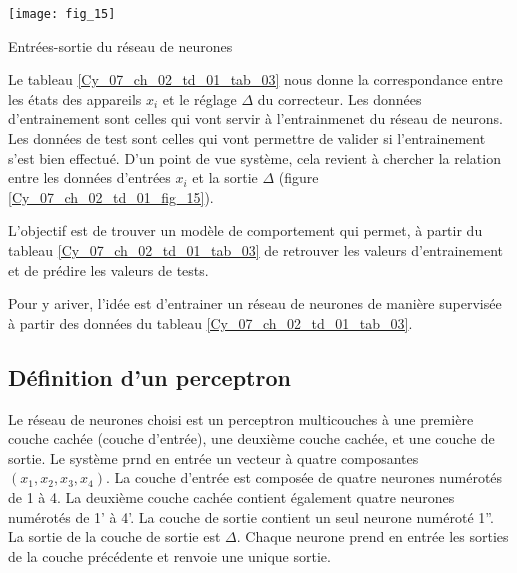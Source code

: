 \begin{marginfigure}
\centering
\texttt{[image: fig\_15]}
\caption{Entrées-sortie du réseau de neurones\label{Cy_07_ch_02_td_01_fig_15}}
\end{marginfigure}

Le tableau \ref{Cy_07_ch_02_td_01_tab_03} nous donne la correspondance entre les états des appareils $x_i$ et le réglage $\Delta$ du correcteur. Les données d'entrainement sont celles qui vont servir à l'entrainmenet du réseau de neurons. Les données de test sont celles qui vont permettre de valider si l'entrainement s'est bien effectué. D'un point de vue système, cela revient à chercher la relation entre les données d'entrées $x_i$ et la sortie $\Delta$ (figure \ref{Cy_07_ch_02_td_01_fig_15}). 


L'objectif est de trouver un modèle de comportement qui permet, à partir du tableau \ref{Cy_07_ch_02_td_01_tab_03} de retrouver les valeurs d'entrainement et de prédire les valeurs de tests. 

Pour y ariver, l'idée est d'entrainer un réseau de neurones de manière supervisée à partir des données du tableau \ref{Cy_07_ch_02_td_01_tab_03}.

\ifprof
\begin{corrige}
\end{corrige}
\else
\fi

\ifprof
\begin{corrige}
\end{corrige}
\else
\fi


\subsection*{Définition d'un perceptron}

Le réseau de neurones choisi est un perceptron multicouches à une première couche cachée (couche d'entrée), une deuxième couche cachée, et une couche de sortie. Le système prnd en entrée un vecteur à quatre composantes $\left(x_1, x_2, x_3, x_4 \right)$. La couche d'entrée est composée de quatre neurones numérotés de 1 à 4. La deuxième couche cachée contient également quatre neurones numérotés de 1' à 4'. La couche de sortie contient un seul neurone numéroté 1''. La sortie de la couche de sortie est $\Delta$. Chaque neurone prend en entrée les sorties de la couche précédente et renvoie une unique sortie.

